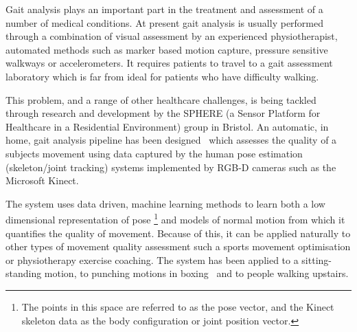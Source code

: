 \documentclass[11pt]{article} %
\begin{document}

Gait analysis plays an important part in the treatment and assessment of a number of medical conditions. At present gait analysis is usually performed through a combination of visual assessment by an experienced physiotherapist, automated methods such as marker based motion capture, pressure sensitive walkways or accelerometers. It requires patients to travel to a gait assessment laboratory which is far from ideal for patients who have difficulty walking. 

This problem, and a range of other healthcare challenges, is being tackled through research and development by the SPHERE (a Sensor Platform for Healthcare in a Residential Environment) group in Bristol. An automatic, in home, gait analysis pipeline has been designed~\cite{Paiement,Tao} which assesses the quality of a subjects movement using data captured by the human pose estimation (skeleton/joint tracking) systems implemented by RGB-D cameras such as the Microsoft Kinect.

The system uses data driven, machine learning methods to learn both a low dimensional representation of pose \footnote{The points in this space are referred to as the pose vector, and the Kinect skeleton data as the body configuration or joint position vector.} and models of normal motion from which it quantifies the quality of movement. Because of this, it can be applied naturally to other types of movement quality assessment such a sports movement optimisation or physiotherapy exercise coaching. The system has been applied to a sitting-standing motion, to punching motions in boxing~\cite{SPHEREweb} and to people walking upstairs. 
\end{document}
